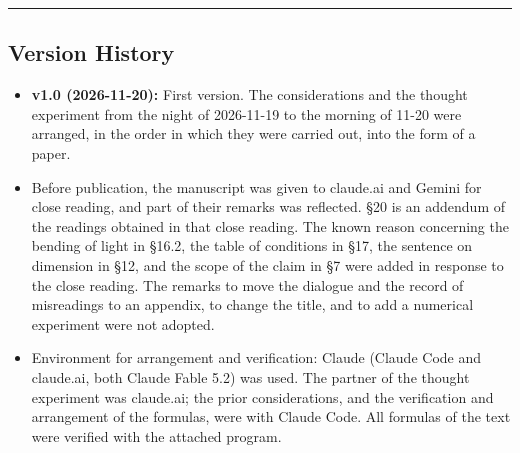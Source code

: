 \documentclass[
  a4paper,
]{article}
\providecommand{\tightlist}{%
  \setlength{\itemsep}{0pt}\setlength{\parskip}{0pt}}
\begin{document}
\begin{center}\rule{0.5\linewidth}{0.5pt}\end{center}

\subsection{Version History}\label{version-history}

\begin{itemize}
\tightlist
\item
  \textbf{v1.0 (2026-11-20):} First version. The considerations and the
  thought experiment from the night of 2026-11-19 to the morning of
  11-20 were arranged, in the order in which they were carried out, into
  the form of a paper.
\item
  Before publication, the manuscript was given to claude.ai and Gemini
  for close reading, and part of their remarks was reflected. §20 is an
  addendum of the readings obtained in that close reading. The known
  reason concerning the bending of light in §16.2, the table of
  conditions in §17, the sentence on dimension in §12, and the scope of
  the claim in §7 were added in response to the close reading. The
  remarks to move the dialogue and the record of misreadings to an
  appendix, to change the title, and to add a numerical experiment were
  not adopted.
\item
  Environment for arrangement and verification: Claude (Claude Code and
  claude.ai, both Claude Fable 5.2) was used. The partner of the thought
  experiment was claude.ai; the prior considerations, and the
  verification and arrangement of the formulas, were with Claude Code.
  All formulas of the text were verified with the attached program.
\end{itemize}
\end{document}
